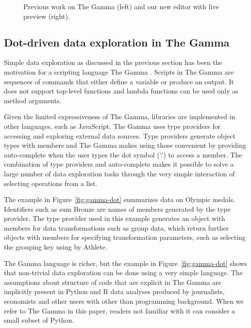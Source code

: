 \documentclass[english,submission]{programming}
\theoremstyle{plain}
\theoremstyle{definition}
\newcommand{\qident}[1]{\textnormal{\sffamily \textquotesingle #1\textquotesingle}}
\begin{document}
\begin{figure}
  \caption{\small Previous work on The Gamma (left) and our new editor with live preview (right).}
  \label{fig:gamma-intro}
  \vspace{-0.5em}
\end{figure}


\subsection{Dot-driven data exploration in The Gamma}
\label{sec:background-gamma}

Simple data exploration as discussed in the previous section has been the motivation for
a scripting language The Gamma \cite{gamma}. Scripts in The Gamma are sequences of commands
that either define a variable or produce an output. It does not support top-level
functions and lambda functions can be used only as method arguments.

Given the limited expressiveness of The Gamma, libraries are implemented in other languages,
such as JavaScript. The Gamma uses type providers \cite{providers-fsharp}
for accessing and exploring external data sources.
Type providers generate object types with members and The Gamma makes using those convenient by
providing auto-complete when the user types the dot symbol (`.') to access a member.
The combination of type providers and auto-complete makes it
possible to solve a large number of data exploration tasks through the very simple interaction of
selecting operations from a list.

The example in Figure~\ref{fig:gamma-dot} summarizes data on Olympic medals. Identifiers such
as \qident{sum Bronze} are names of members generated by the type provider. The type provider
used in this example generates an object with members for data transformations such as
\qident{group data}, which return further objects with members for specifying transformation
parameters, such as selecting the grouping key using \qident{by Athlete}.

The Gamma language is richer, but the example in Figure~\ref{fig:gamma-dot} shows that non-trivial
data exploration can be done using a very simple language. The assumptions about structure of
code that are explicit in The Gamma are implicitly present in Python and R data analyses
produced by journalists, economists and other users with other than programming background.
When we refer to The Gamma in this paper, readers not familiar with it can consider a small
subset of Python.
\end{document}
